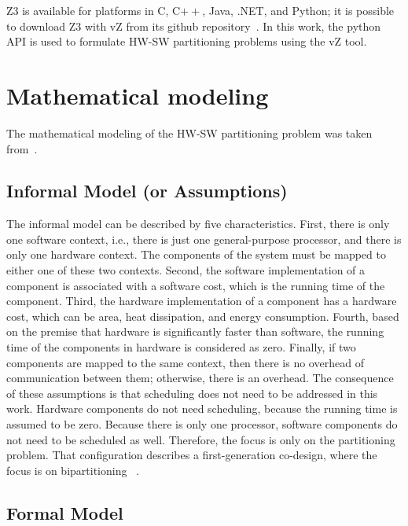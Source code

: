 Z3 is available for platforms in C, C$++$, Java, .NET, and Python; it is possible to download Z3 with vZ from its github repository~\cite{Z3API}. In this work, the python API is used to formulate HW-SW partitioning problems using the vZ tool. 

\section{Mathematical modeling}
\label{Mathematical-modeling}

The mathematical modeling of the HW-SW partitioning problem was taken from~\cite{Arato2003,Mann2007}.

\subsection{Informal Model (or Assumptions)}
\label{Informal-Model-or-Assumptions}

The informal model can be described by five characteristics. First, there is only one software context, i.e., there is just one general-purpose processor, and there is only one hardware context. The components of the system must be mapped to either one of these two contexts. Second, the software implementation of a component is associated with a software cost, which is the running time of the component. Third, the hardware implementation of a component has a hardware cost, which can be area, heat dissipation, and energy consumption. Fourth, based on the premise that hardware is significantly faster than software, the running time of the components in hardware is considered as zero. Finally, if two components are mapped to the same context, then there is no overhead of communication between them; otherwise, there is an overhead. The consequence of these assumptions is that scheduling does not need to be addressed in this work. Hardware components do not need scheduling, because the running time is assumed to be zero. Because there is only one processor, software components do not need to be scheduled as well. Therefore, the focus is only on the partitioning problem. That configuration describes a first-generation co-design, where the focus is on bipartitioning ~\cite{Teich2012}.

\subsection{Formal Model}
\label{Formal-Model}


